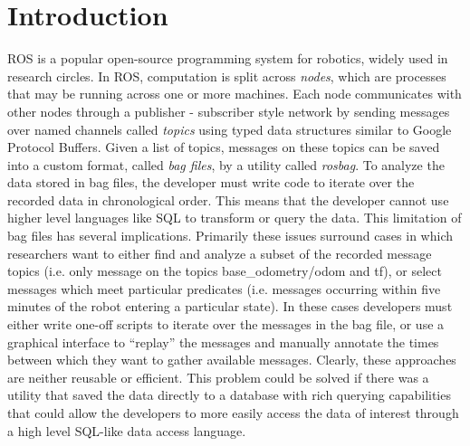\documentclass[nocopyrightspace]{acm_proc_article-sp}
\begin{document}
\section{Introduction}
\label{intro}

ROS is a popular open-source programming system for robotics, widely used in research circles. In ROS, computation is split across \textit{nodes}, which are processes that may be running across one or more machines. Each node communicates with other nodes through a publisher - subscriber style network by sending messages over named channels called \textit{topics} using typed data structures similar to Google Protocol Buffers. Given a list of topics, messages on these topics can be saved into a custom format, called \textit{bag files}, by a utility called \textit{rosbag}. To analyze the data stored in bag files, the developer must write code to iterate over the recorded data in chronological order. This means that the developer cannot use higher level languages like SQL to transform or query the data. This limitation of bag files has several implications. Primarily these issues surround cases in which researchers want to either find and analyze a subset of the recorded message topics (i.e. only message on the topics base\_odometry/odom and tf), or select messages which meet particular predicates (i.e. messages occurring within five minutes of the robot entering a particular state). In these cases developers must either write one-off scripts to iterate over the messages in the bag file, or use a graphical interface to ``replay'' the messages and manually annotate the times between which they want to gather available messages. Clearly, these approaches are neither reusable or efficient. This problem could be solved if there was a utility that saved the data directly to a database with rich querying capabilities that could allow the developers to more easily access the data of interest through a high level SQL-like data access language.
\end{document}
